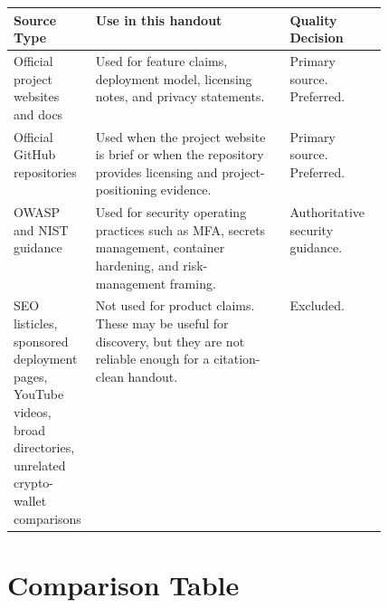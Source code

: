\documentclass[11pt]{article}
\begin{document}
\begin{tabularx}{\linewidth}{>{\RaggedRight\arraybackslash}p{0.22\linewidth} >{\RaggedRight\arraybackslash}X >{\RaggedRight\arraybackslash}p{0.26\linewidth}}
\rowcolor{headergray}\textbf{Source Type} & \textbf{Use in this handout} & \textbf{Quality Decision} \\
\toprule
Official project websites and docs & Used for feature claims, deployment model, licensing notes, and privacy statements. & Primary source. Preferred. \\
Official GitHub repositories & Used when the project website is brief or when the repository provides licensing and project-positioning evidence. & Primary source. Preferred. \\
OWASP and NIST guidance & Used for security operating practices such as MFA, secrets management, container hardening, and risk-management framing. & Authoritative security guidance. \\
SEO listicles, sponsored deployment pages, YouTube videos, broad directories, unrelated crypto-wallet comparisons & Not used for product claims. These may be useful for discovery, but they are not reliable enough for a citation-clean handout. & Excluded. \\
\bottomrule
\end{tabularx}

\section{Comparison Table}
\end{document}
